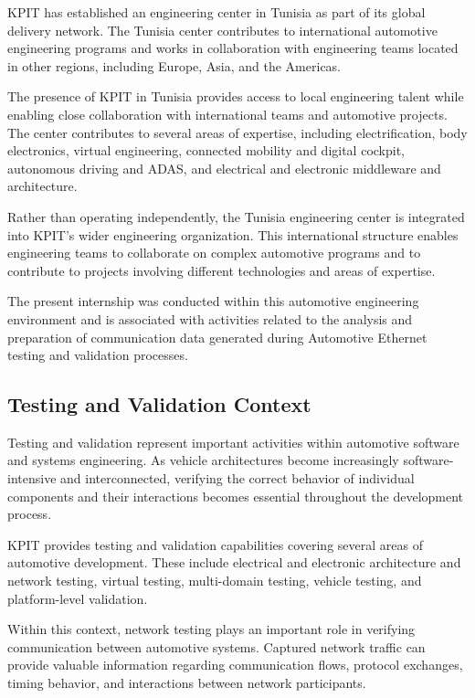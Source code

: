 KPIT has established an engineering center in Tunisia as part of its global delivery network. The Tunisia center contributes to international automotive engineering programs and works in collaboration with engineering teams located in other regions, including Europe, Asia, and the Americas.

The presence of KPIT in Tunisia provides access to local engineering talent while enabling close collaboration with international teams and automotive projects. The center contributes to several areas of expertise, including electrification, body electronics, virtual engineering, connected mobility and digital cockpit, autonomous driving and ADAS, and electrical and electronic middleware and architecture.

Rather than operating independently, the Tunisia engineering center is integrated into KPIT's wider engineering organization. This international structure enables engineering teams to collaborate on complex automotive programs and to contribute to projects involving different technologies and areas of expertise.

The present internship was conducted within this automotive engineering environment and is associated with activities related to the analysis and preparation of communication data generated during Automotive Ethernet testing and validation processes.

\subsection{Testing and Validation Context}

Testing and validation represent important activities within automotive software and systems engineering. As vehicle architectures become increasingly software-intensive and interconnected, verifying the correct behavior of individual components and their interactions becomes essential throughout the development process.

KPIT provides testing and validation capabilities covering several areas of automotive development. These include electrical and electronic architecture and network testing, virtual testing, multi-domain testing, vehicle testing, and platform-level validation.

Within this context, network testing plays an important role in verifying communication between automotive systems. Captured network traffic can provide valuable information regarding communication flows, protocol exchanges, timing behavior, and interactions between network participants.

